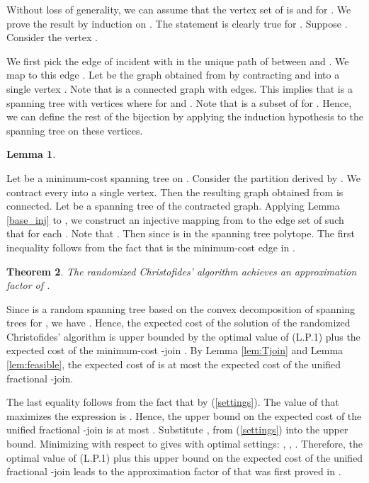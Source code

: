 \documentclass[11pt]{article}
\newcommand{\qed}{\hspace*{\fill}}
\newtheorem{theorem}{Theorem}[section]
\newtheorem{lemma}[theorem]{Lemma}
\newenvironment{proof}[1][Proof. ]{\noindent {\bf #1 }}{\qed}
\begin{document}
\begin{proof}Without loss of generality, we can assume that the vertex set of  is 
and  for . We prove the result by induction on .
The statement is clearly true for .
Suppose .
Consider the vertex .

We first pick the edge  of  incident with 
in the unique path of  between  and . We map  to this edge . Let  be the graph obtained from  by
contracting  and  into a single vertex . Note that  is a connected graph with  edges. This implies
that  is a spanning tree with  vertices  where  for  and .
Note that  is a subset of  for . Hence, we can define
the rest of the bijection by applying the induction hypothesis
to the spanning tree  on these  vertices.











\end{proof}


\begin{lemma}\label{lem:ineq1}

\end{lemma}

\begin{proof}
Let  be a minimum-cost spanning tree on .
Consider the partition  derived by .
We contract every  into a single vertex.
Then the resulting graph obtained from  is connected.
Let  be a spanning tree of the contracted graph.
Applying Lemma \ref{base_inj} to ,
we construct an injective mapping  from 
to the edge set of  such that 
for each .
Note that .
Then 
since  is in the spanning tree polytope. The first inequality follows from the fact that
 is the minimum-cost edge in .
\end{proof}

\begin{theorem}\cite{AKS12}\label{thm:AKS}
The randomized Christofides' algorithm achieves an
approximation factor of .
\end{theorem}
\begin{proof}
Since  is a random spanning tree based on the convex decomposition of spanning trees for , we have . Hence, the expected cost of the solution of the randomized
Christofides' algorithm is upper bounded by the optimal value of (L.P.1) plus the expected cost of the
minimum-cost -join . By Lemma \ref{lem:Tjoin} and Lemma \ref{lem:feasible}, the expected cost of  is
at most the expected cost of the unified fractional -join.

The last equality follows from the fact that  by (\ref{settings}). The value of  that maximizes
the expression is . Hence, the upper bound on the expected cost of the unified fractional
-join is at most . Substitute ,  from (\ref{settings}) into the upper bound.
Minimizing with respect to  gives  with optimal settings:  ,
, .
Therefore, the optimal value of (L.P.1) plus this upper bound  on the expected cost of the unified fractional -join leads to
the approximation factor of
 that was first proved in \cite{AKS12}.
\end{proof}
\end{document}
